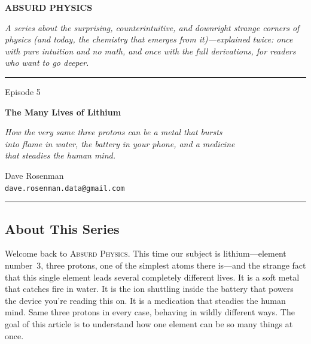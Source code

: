 \documentclass[11pt, letterpaper]{article}
\newcommand{\seriesname}{\textsc{Absurd Physics}}
\begin{document}

\begin{center}
\vspace*{1.5cm}

{\fontsize{36}{42}\selectfont\bfseries\textcolor{accentblue}{ABSURD PHYSICS}}

\vspace{8pt}
{\large\textcolor{seriestitle}{\textit{A series about the surprising, counterintuitive, and downright strange corners of physics (and today, the chemistry that emerges from it)---explained twice: once with pure intuition and no math, and once with the full derivations, for readers who want to go deeper.}}}

\vspace{1.5cm}
\rule{0.6\textwidth}{0.5pt}
\vspace{1.5cm}

{\fontsize{24}{30}\selectfont Episode 5}

\vspace{10pt}

{\fontsize{28}{34}\selectfont\bfseries The Many Lives of Lithium}

\vspace{8pt}
{\large\textit{How the very same three protons can be a metal that bursts\\into flame in water, the battery in your phone, and a medicine\\that steadies the human mind.}}

\vspace{1.5cm}

{\large Dave Rosenman}\\[4pt]
{\normalsize \texttt{dave.rosenman.data@gmail.com}}

\vspace{1.5cm}
\rule{0.6\textwidth}{0.5pt}
\end{center}

\vspace{1cm}

\subsection*{About This Series}

Welcome back to \seriesname. This time our subject is lithium---element number~3, three protons, one of the simplest atoms there is---and the strange fact that this single element leads several completely different lives. It is a soft metal that catches fire in water. It is the ion shuttling inside the battery that powers the device you're reading this on. It is a medication that steadies the human mind. Same three protons in every case, behaving in wildly different ways. The goal of this article is to understand how one element can be so many things at once.
\end{document}
